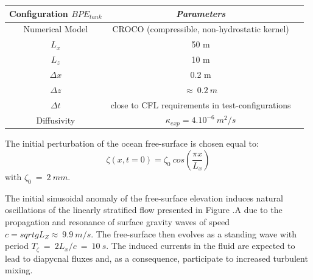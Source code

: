 \begin{table}[h]
        \centering
        \begin{tabular}{|c|c|c|}
                \hline
                Configuration $BPE_{tank}$ & \textit{Parameters}\\
                \hline 
                Numerical Model & CROCO (compressible, non-hydrostatic kernel)\\
                $L_x$ & 50 m\\
                $L_z$ & 10 m\\
                $\Delta x$ & 0.2 m\\
                $\Delta z$ & $\approx\ 0.2\ m$\\
                $\Delta t$ & close to CFL requirements in test-configurations\\
                Diffusivity & $\kappa_{exp} = 4.10^{-6} \ m^2/s$\\
                \hline
        \end{tabular}
        \label{tab_BPE_TANK}
\end{table}
The initial perturbation of the ocean free-surface is chosen equal to:
\begin{equation}
\displaystyle
\zeta(x,t=0)=\zeta_0\ cos\left(\frac{\pi x}{L_x}\right)
\end{equation}
with $\zeta_0\ =\ 2\ mm$.

The initial sinusoidal anomaly of the free-surface elevation induces natural oscillations of the linearly stratified flow presented in Figure .A due to the propagation and resonance of surface gravity waves of speed $c=sqrt{gL_Z}\approx \ 9.9\ m/s$. \color{red}The free-surface then evolves as a standing wave with period $T_{\zeta}\ =\ 2 L_x/c\ =\ 10\ s$.\color{black} The induced currents in the fluid are expected to lead to diapycnal fluxes and, as a consequence, participate to increased turbulent mixing.

